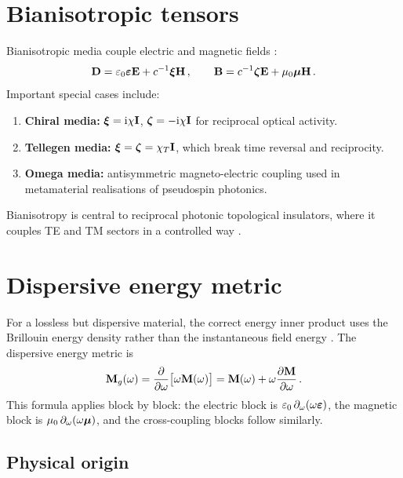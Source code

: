 \section{Bianisotropic tensors}
\label{sec:appD-bianisotropic}

Bianisotropic media couple electric and magnetic fields \cite{slobozhanyuk2015observation}:
\begin{equation}\label{eq:appD-bianisotropic-expanded}
  \mathbf{D}=\varepsilon_0\boldsymbol{\varepsilon}\mathbf{E}+c^{-1}\boldsymbol{\xi}\mathbf{H}\,,
  \qquad
  \mathbf{B}=c^{-1}\boldsymbol{\zeta}\mathbf{E}+\mu_0\boldsymbol{\mu}\mathbf{H}\,.
\end{equation}
Important special cases include:
\begin{enumerate}[label=(\roman*)]
  \item \textbf{Chiral media:} $\boldsymbol{\xi}=\mathrm{i}\chi\mathbf{I}$,
    $\boldsymbol{\zeta}=-\mathrm{i}\chi\mathbf{I}$ for reciprocal optical activity.
  \item \textbf{Tellegen media:} $\boldsymbol{\xi}=\boldsymbol{\zeta}=\chi_T\mathbf{I}$,
    which break time reversal and reciprocity.
  \item \textbf{Omega media:} antisymmetric magneto-electric coupling
    used in metamaterial realisations of pseudospin photonics.
\end{enumerate}
Bianisotropy is central to reciprocal photonic topological insulators,
where it couples TE and TM sectors in a controlled way \cite{khanikaev2013photonic}.

\section{Dispersive energy metric}
\label{sec:appD-energy-metric}

For a lossless but dispersive material, the correct energy inner product
uses the Brillouin energy density rather than the instantaneous field
energy \cite{gangaraj2016berry,silveirinha2016bulk}.  The dispersive
energy metric is
\begin{equation}\label{eq:appD-Mg}
  \mathbf{M}_g(\omega)=\frac{\partial }{\partial \omega}\bigl[\omega\mathbf{M}(\omega)\bigr]
  =\mathbf{M}(\omega)+\omega\frac{\partial \mathbf{M}}{\partial \omega}\,.
\end{equation}
This formula applies block by block: the electric block is
$\varepsilon_0\,\partial_\omega(\omega\boldsymbol{\varepsilon})$, the magnetic block is
$\mu_0\,\partial_\omega(\omega\boldsymbol{\mu})$, and the cross-coupling blocks
follow similarly.

\subsection{Physical origin}
\label{sec:appD-Mg-physical}

